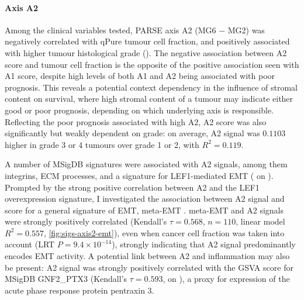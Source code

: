 \documentclass[dissertation.tex]{subfiles}
\begin{document}
\paragraph{Axis A2}
Among the clinical variables tested, \gls{PARSE} axis A2 (MG6 $-$ MG2) was negatively correlated with qPure tumour cell fraction, and positively associated with higher tumour histological grade ().  The negative association between A2 score and tumour cell fraction is the opposite of the positive association seen with A1 score, despite high levels of both A1 and A2 being associated with poor prognosis.  This reveals a potential context dependency in the influence of stromal content on survival, where high stromal content of a tumour may indicate either good or poor prognosis, depending on which underlying axis is responsible.    Reflecting the poor prognosis associated with high A2, A2 score was also significantly but weakly dependent on grade: on average, A2 signal was $0.1103$ higher in grade 3 or 4 tumours over grade 1 or 2, with $R^2 = 0.119$.

A number of \gls{MSigDB} signatures were associated with A2 signals, among them integrins, \gls{ECM} processes, and a signature for LEF1-mediated \gls{EMT} ( on ).  Prompted by the strong positive correlation between A2 and the LEF1 overexpression signature, I investigated the association between A2 signal and score for a general signature of \gls{EMT}, meta-EMT \cite{Groger2012}.  meta-EMT and A2 signals were strongly positively correlated (Kendall's $\tau = 0.568$, $n = 110$, linear model $R^2 = 0.557$, \ref{fig:sigs-axis2-emt}), even when cancer cell fraction was taken into account (LRT $P = 9.4 \times 10^{-14}$), strongly indicating that A2 signal predominantly encodes \gls{EMT} activity.  A potential link between A2 and inflammation may also be present: A2 signal was strongly positively correlated with the \gls{GSVA} score for \gls{MSigDB} GNF2\_PTX3 (Kendall's $\tau = 0.593$,  on ), a proxy for expression of the acute phase response protein pentraxin 3.
\end{document}
